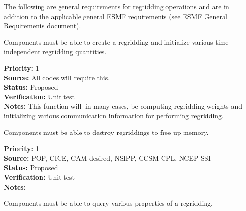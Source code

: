 


The following are general requirements for regridding operations and are in
addition to the applicable general ESMF requirements (see ESMF General
Requirements document).


Components must be able to create a regridding and initialize
various time-independent regridding quantities.

\begin{reqlist}
{\bf Priority:} 1 \\
{\bf Source:} All codes will require this. \\
{\bf Status:} Proposed \\
{\bf Verification:} Unit test \\
{\bf Notes:} This function will, in many cases, be computing
             regridding weights and initializing various
             communication information for performing regridding.
\end{reqlist}


Components must be able to destroy regriddings to free up memory.

\begin{reqlist}
{\bf Priority:} 1 \\
{\bf Source:} POP, CICE, CAM desired, NSIPP, CCSM-CPL, NCEP-SSI \\
{\bf Status:} Proposed \\
{\bf Verification:} Unit test \\
{\bf Notes:} 
\end{reqlist}


Components must be able to query various properties of a regridding.

